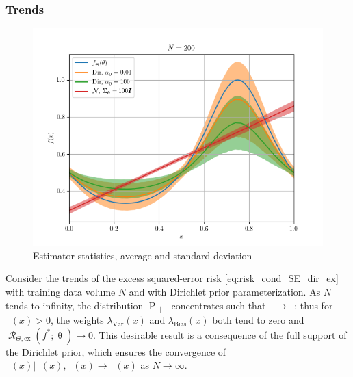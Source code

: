 \documentclass{article}
\DeclareMathOperator{\Prm}{\mathrm{P}}
\DeclareMathOperator{\Rcal}{\mathcal{R}}
\DeclareMathOperator{\thetam}{\theta_\text{m}}
\DeclareMathOperator{\upthetam}{\uptheta_\text{m}}
\DeclareMathOperator{\upthetac}{\uptheta_\text{c}}
\DeclareMathOperator{\uppsim}{\uppsi_\text{m}}
\DeclareMathOperator{\uppsic}{\uppsi_\text{c}}
\begin{document}
\subsubsection{Trends}

\begin{figure}
\centering
\includegraphics[width=1\linewidth]{SSP_2021/Predict_SE_biased_hard.png}
\caption{Estimator statistics, average and standard deviation}
\label{fig:Predict_SE_biased_hard}
\end{figure}

Consider the trends of the excess squared-error risk \eqref{eq:risk_cond_SE_dir_ex} with training data volume $N$ and with Dirichlet prior parameterization. As $N$ tends to infinity, the distribution $\Prm_{\uppsim | \upthetam}$ concentrates such that $\uppsim \to \thetam$; thus for $\thetam(x) > 0$, the weights $\lambda_{\text{Var}}(x)$ and $\lambda_{\text{Bias}}(x)$ both tend to zero and $\Rcal_{\Theta, \mathrm{ex}}(f^* ; \uptheta) \to 0$. This desirable result is a consequence of the full support of the Dirichlet prior, which ensures the convergence of $\upthetac(x) | \uppsim(x),\uppsic(x) \to \uppsic(x)$ as $N \to \infty$.
\end{document}
